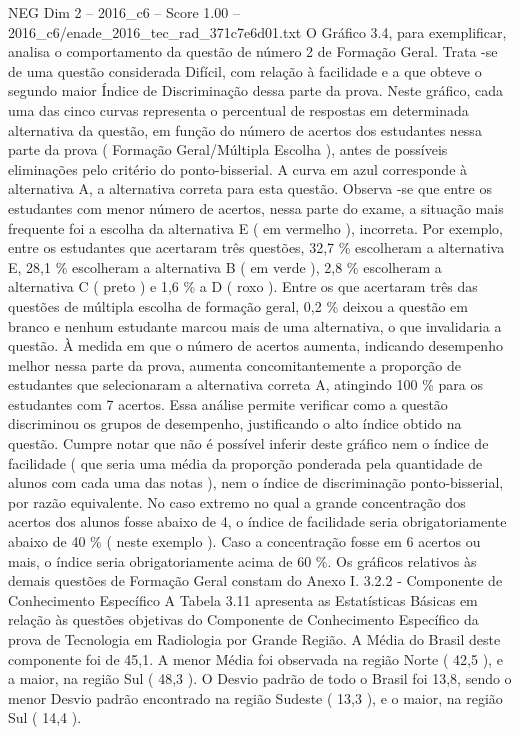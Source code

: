\begin{textsample}{NEG Dim 2 – 2016\_c6 – Score 1.00 – 2016\_c6/enade\_2016\_tec\_rad\_371c7e6d01.txt}
O Gráfico 3.4, para exemplificar, analisa o comportamento da questão de número 2 de Formação Geral.
Trata -se de uma questão considerada Difícil, com relação à facilidade e a que obteve o segundo maior Índice de Discriminação dessa parte da prova.
Neste gráfico, cada uma das cinco curvas representa o percentual de respostas em determinada alternativa da questão, em função do número de acertos dos estudantes nessa parte da prova ( Formação Geral/Múltipla Escolha ), antes de possíveis eliminações pelo critério do ponto-bisserial.
A curva em azul corresponde à alternativa A, a alternativa correta para esta questão.
Observa -se que entre os estudantes com menor número de acertos, nessa parte do exame, a situação mais frequente foi a escolha da alternativa E ( em vermelho ), incorreta.
Por exemplo, entre os estudantes que acertaram três questões, 32,7 \% escolheram a alternativa E, 28,1 \% escolheram a alternativa B ( em verde ), 2,8 \% escolheram a alternativa C ( preto ) e 1,6 \% a D ( roxo ).
Entre os que acertaram três das questões de múltipla escolha de formação geral, 0,2 \% deixou a questão em branco e nenhum estudante marcou mais de uma alternativa, o que invalidaria a questão.
À medida em que o número de acertos aumenta, indicando desempenho melhor nessa parte da prova, aumenta concomitantemente a proporção de estudantes que selecionaram a alternativa correta A, atingindo 100 \% para os estudantes com 7 acertos.
Essa análise permite verificar como a questão discriminou os grupos de desempenho, justificando o alto índice obtido na questão.
Cumpre notar que não é possível inferir deste gráfico nem o índice de facilidade ( que seria uma média da proporção ponderada pela quantidade de alunos com cada uma das notas ), nem o índice de discriminação ponto-bisserial, por razão equivalente.
No caso extremo no qual a grande concentração dos acertos dos alunos fosse abaixo de 4, o índice de facilidade seria obrigatoriamente abaixo de 40 \% ( neste exemplo ).
Caso a concentração fosse em 6 acertos ou mais, o índice seria obrigatoriamente acima de 60 \%.
Os gráficos relativos às demais questões de Formação Geral constam do Anexo I. 3.2.2 - Componente de Conhecimento Específico A Tabela 3.11 apresenta as Estatísticas Básicas em relação às questões objetivas do Componente de Conhecimento Específico da prova de Tecnologia em Radiologia por Grande Região.
A Média do Brasil deste componente foi de 45,1.
A menor Média foi observada na região Norte ( 42,5 ), e a maior, na região Sul ( 48,3 ).
O Desvio padrão de todo o Brasil foi 13,8, sendo o menor Desvio padrão encontrado na região Sudeste ( 13,3 ), e o maior, na região Sul ( 14,4 ).

\end{textsample}
